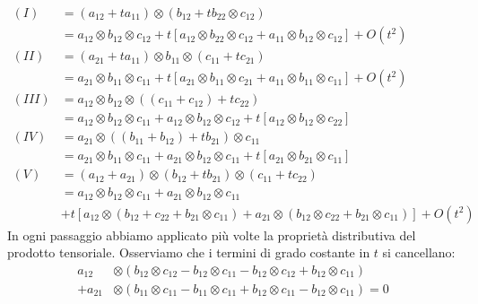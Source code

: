 \begin{equation*}
	\begin{aligned}
		(I)   & = (a_{12} + ta_{11}) \otimes (b_{12} + tb_{22} \otimes c_{12})                                   \\
		      & = a_{12} \otimes b_{12} \otimes c_{12} + t[a_{12} \otimes b_{22} \otimes c_{12} + a_{11} \otimes
		b_{12} \otimes c_{12}] + O(t^2)                                                                          \\
		(II)  & = (a_{21} + ta_{11}) \otimes b_{11} \otimes (c_{11} + tc_{21})                                   \\
		      & = a_{21} \otimes b_{11} \otimes c_{11} +t[a_{21} \otimes b_{11} \otimes c_{21} + a_{11} \otimes
		b_{11} \otimes c_{11}] + O(t^2)                                                                          \\
		(III) & = a_{12} \otimes b_{12} \otimes ((c_{11} + c_{12}) + tc_{22})                                    \\
		      & = a_{12} \otimes b_{12} \otimes c_{11} + a_{12} \otimes b_{12} \otimes c_{12} + t \left[ a_{12}
		\otimes b_{12} \otimes c_{22} \right]                                                                    \\
		(IV)  & = a_{21} \otimes ((b_{11} + b_{12}) + tb_{21}) \otimes c_{11}                                    \\
		      & = a_{21} \otimes b_{11} \otimes c_{11} + a_{21} \otimes b_{12} \otimes c_{11} + t[a_{21} \otimes
		b_{21} \otimes c_{11}]                                                                                   \\
		(V)   & = (a_{12} + a_{21}) \otimes (b_{12} + tb_{21}) \otimes (c_{11} + tc_{22})                        \\
		      & =a_{12}\otimes b_{12} \otimes c_{11} + a_{21} \otimes b_{12} \otimes c_{11}                      \\
		      & + t[a_{12} \otimes
				(b_{12} + c_{22} + b_{21} \otimes c_{11}) + a_{21} \otimes (b_{12} \otimes c_{22} + b_{21} \otimes
				c_{11})] + O(t^2)
	\end{aligned}
\end{equation*}
In ogni passaggio abbiamo applicato più volte la proprietà distributiva del prodotto tensoriale.
Osserviamo che i termini di grado costante in $ t $ si cancellano:
\begin{equation*}
	\begin{aligned}
		a_{12}   & \otimes (b_{12} \otimes c_{12} - b_{12} \otimes c_{11} - b_{12} \otimes c_{12} + b_{12} \otimes
		c_{11})                                                                                                            \\
		+ a_{21} & \otimes (b_{11} \otimes c_{11} - b_{11} \otimes c_{11} + b_{12} \otimes c_{11} - b_{12} \otimes c_{11})
		= 0
	\end{aligned}
\end{equation*}

